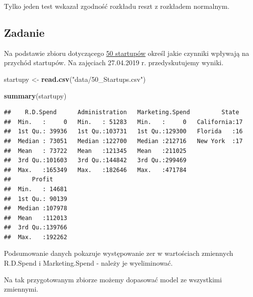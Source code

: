\documentclass[]{book}
\newenvironment{Shaded}{\begin{snugshade}}{\end{snugshade}}
\newcommand{\DecValTok}[1]{\textcolor[rgb]{0.00,0.00,0.81}{#1}}
\newcommand{\KeywordTok}[1]{\textcolor[rgb]{0.13,0.29,0.53}{\textbf{#1}}}
\newcommand{\NormalTok}[1]{#1}
\newcommand{\OperatorTok}[1]{\textcolor[rgb]{0.81,0.36,0.00}{\textbf{#1}}}
\newcommand{\StringTok}[1]{\textcolor[rgb]{0.31,0.60,0.02}{#1}}
\begin{document}
Tylko jeden test wskazał zgodność rozkładu reszt z rozkładem normalnym.

\hypertarget{zadanie-1}{%
\subsection{Zadanie}\label{zadanie-1}}

Na podstawie zbioru dotyczącego \href{data/50_Startups.csv}{50 startupów} określ jakie czynniki wpływają na przychód startupów. Na zajęciach 27.04.2019 r. przedyskutujemy wyniki.

\begin{Shaded}
\begin{Highlighting}[]
\NormalTok{startupy <-}\StringTok{ }\KeywordTok{read.csv}\NormalTok{(}\StringTok{"data/50_Startups.csv"}\NormalTok{)}

\KeywordTok{summary}\NormalTok{(startupy)}
\end{Highlighting}
\end{Shaded}

\begin{verbatim}
##    R.D.Spend      Administration   Marketing.Spend         State   
##  Min.   :     0   Min.   : 51283   Min.   :     0   California:17  
##  1st Qu.: 39936   1st Qu.:103731   1st Qu.:129300   Florida   :16  
##  Median : 73051   Median :122700   Median :212716   New York  :17  
##  Mean   : 73722   Mean   :121345   Mean   :211025                  
##  3rd Qu.:101603   3rd Qu.:144842   3rd Qu.:299469                  
##  Max.   :165349   Max.   :182646   Max.   :471784                  
##      Profit      
##  Min.   : 14681  
##  1st Qu.: 90139  
##  Median :107978  
##  Mean   :112013  
##  3rd Qu.:139766  
##  Max.   :192262
\end{verbatim}

Podsumowanie danych pokazuje występowanie zer w wartościach zmiennych R.D.Spend i Marketing.Spend - należy je wyeliminować.

\begin{Shaded}
\end{Shaded}

Na tak przygotowanym zbiorze możemy dopasować model ze wszystkimi zmiennymi.
\end{document}
